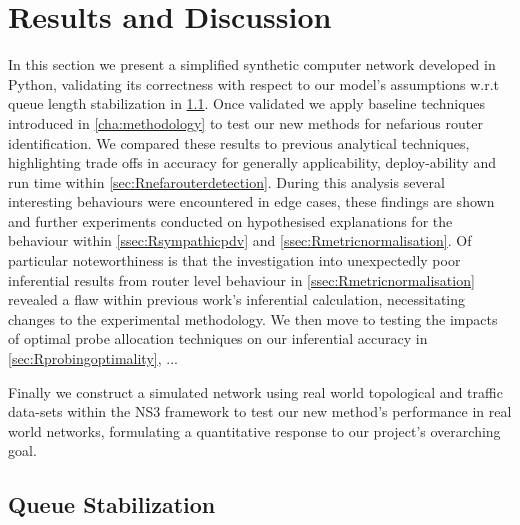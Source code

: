 \chapter{Results and Discussion}
\label{cha:result}
In this section we present a simplified synthetic computer network developed in Python, validating its correctness with respect to our model's assumptions w.r.t queue length stabilization in \cref{sec:Rqueuestabilization}. Once validated we apply baseline techniques introduced in \cref{cha:methodology} to test our new methods for nefarious router identification. We compared these results to previous analytical techniques, highlighting trade offs in accuracy for generally applicability, deploy-ability and run time within \cref{sec:Rnefarouterdetection}. During this analysis several interesting behaviours were encountered in edge cases, these findings are shown and further experiments conducted on hypothesised explanations for the behaviour within \cref{ssec:Rsympathicpdv} and \cref{ssec:Rmetricnormalisation}. Of particular noteworthiness is that the investigation into unexpectedly poor inferential results from router level \pdv  behaviour in \cref{ssec:Rmetricnormalisation} revealed a flaw within previous work's inferential calculation, necessitating changes to the experimental methodology. We then move to testing the impacts of optimal probe allocation techniques on our inferential accuracy in \cref{sec:Rprobingoptimality}, ...\par
{}
Finally we construct a simulated network using real world topological and traffic data-sets within the NS3 framework to test our new method's performance in real world networks, formulating a quantitative response to our project's overarching goal.

\section{Queue Stabilization}
\label{sec:Rqueuestabilization}

